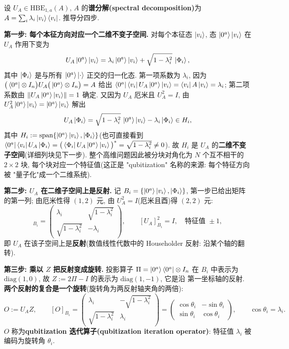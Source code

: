 \documentclass[utf8]{article} %
\numberwithin{equation}{section}   %
\begin{document}
设 $U_A \in \mathrm{HBE}_{1,a}(A)$, $A$ 的\textbf{谱分解(spectral decomposition)}为 $A = \sum_i \lambda_i \ket{v_i}\bra{v_i}$.
推导分四步.

\textbf{第一步: 每个本征方向对应一个二维不变子空间.} 对每个本征态 $\ket{v_i}$, 态 $\ket{0^a}\ket{v_i}$
在 $U_A$ 作用下变为
\begin{equation}
    U_A \ket{0^a}\ket{v_i} = \lambda_i \ket{0^a}\ket{v_i} + \sqrt{1-\lambda_i^2}\,\ket{\Phi_i},
\end{equation}
其中 $\ket{\Phi_i}$ 是与所有 $\ket{0^a}\ket{\cdot}$ 正交的归一化态. 第一项系数为 $\lambda_i$,
因为 $\big(\bra{0^a}\otimes I_n\big)U_A\big(\ket{0^a}\otimes I_n\big) = A$ 给出
$\bra{0^a}\bra{v_i}U_A\ket{0^a}\ket{v_i} = \bra{v_i}A\ket{v_i} = \lambda_i$;
第二项系数由 $\norm{U_A\ket{0^a}\ket{v_i}} = 1$ 确定. 又因为 $U_A$ 厄米且 $U_A^2 = I$,
由 $U_A^2\ket{0^a}\ket{v_i} = \ket{0^a}\ket{v_i}$ 解出
\begin{equation}
    U_A\ket{\Phi_i} = \sqrt{1-\lambda_i^2}\,\ket{0^a}\ket{v_i} - \lambda_i\ket{\Phi_i} \in H_i,
\end{equation}
其中 $H_i := \mathrm{span}\{\ket{0^a}\ket{v_i}, \ket{\Phi_i}\}$(也可直接看到
$\bra{0^a}\bra{v_i}U_A\ket{\Phi_i} = \big(\bra{\Phi_i}U_A\ket{0^a}\ket{v_i}\big)^* = \sqrt{1-\lambda_i^2} \ne 0$).
故 $H_i$ 是 $U_A$ 的\textbf{二维不变子空间}(详细列块见下一步). 整个高维问题因此被分块对角化为 $N$ 个互不相干的
$2\times2$ 块, 每个块对应一个特征值(这正是 "qubitization" 名称的来源: 每个特征方向被
"量子化"成一个二维系统).

\textbf{第二步: $U_A$ 在二维子空间上是反射.} 记 $B_i = \{\ket{0^a}\ket{v_i}, \ket{\Phi_i}\}$,
第一步已给出矩阵的第一列; 由厄米性得 $(1,2)$ 元, 由 $U_A^2 = I$(厄米且酉)得 $(2,2)$ 元:
\begin{equation}
    [U_A]_{B_i} = \begin{pmatrix} \lambda_i & \sqrt{1-\lambda_i^2} \\ \sqrt{1-\lambda_i^2} & -\lambda_i \end{pmatrix},
    \qquad
    [U_A]_{B_i}^2 = I, \quad \text{特征值 } \pm 1,
\end{equation}
即 $U_A$ 在该子空间上是\textbf{反射}(数值线性代数中的 Householder 反射: 沿某个轴的翻转).

\textbf{第三步: 乘以 $Z$ 把反射变成旋转.} 投影算子 $\Pi = \ket{0^a}\bra{0^a}\otimes I_n$ 在 $B_i$
中表示为 $\mathrm{diag}(1,0)$, 故 $Z := 2\Pi - I$ 的表示为 $\mathrm{diag}(1,-1)$, 它是沿
第一坐标轴的反射. \textbf{两个反射的复合是一个旋转}(旋转角为两反射轴夹角的两倍):
\begin{equation}
    O := U_A Z, \qquad
    [O]_{B_i} = \begin{pmatrix} \lambda_i & -\sqrt{1-\lambda_i^2} \\ \sqrt{1-\lambda_i^2} & \lambda_i \end{pmatrix}
    = \begin{pmatrix} \cos\theta_i & -\sin\theta_i \\ \sin\theta_i & \cos\theta_i \end{pmatrix},
    \qquad \cos\theta_i = \lambda_i.
\end{equation}
$O$ 称为\textbf{qubitization 迭代算子(qubitization iteration operator)}: 特征值 $\lambda_i$
被编码为旋转角 $\theta_i$.
\end{document}
